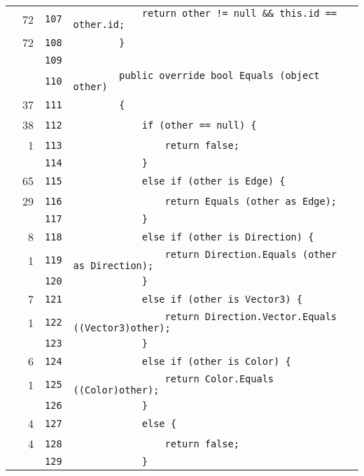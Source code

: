 \documentclass[a4paper,10pt]{article}
\begin{document}
\begin{longtable}[l]{lrrl}
\cellcolor{green} & 72 & \verb~107~ & \verb~            return other != null && this.id == other.id;~\\
\cellcolor{green} & 72 & \verb~108~ & \verb~        }~\\
\cellcolor{gray} &  & \verb~109~ & \verb~~\\
\cellcolor{gray} &  & \verb~110~ & \verb~        public override bool Equals (object other)~\\
\cellcolor{green} & 37 & \verb~111~ & \verb~        {~\\
\cellcolor{green} & 38 & \verb~112~ & \verb~            if (other == null) {~\\
\cellcolor{green} & 1 & \verb~113~ & \verb~                return false;~\\
\cellcolor{gray} &  & \verb~114~ & \verb~            }~\\
\cellcolor{green} & 65 & \verb~115~ & \verb~            else if (other is Edge) {~\\
\cellcolor{green} & 29 & \verb~116~ & \verb~                return Equals (other as Edge);~\\
\cellcolor{gray} &  & \verb~117~ & \verb~            }~\\
\cellcolor{green} & 8 & \verb~118~ & \verb~            else if (other is Direction) {~\\
\cellcolor{green} & 1 & \verb~119~ & \verb~                return Direction.Equals (other as Direction);~\\
\cellcolor{gray} &  & \verb~120~ & \verb~            }~\\
\cellcolor{green} & 7 & \verb~121~ & \verb~            else if (other is Vector3) {~\\
\cellcolor{green} & 1 & \verb~122~ & \verb~                return Direction.Vector.Equals ((Vector3)other);~\\
\cellcolor{gray} &  & \verb~123~ & \verb~            }~\\
\cellcolor{green} & 6 & \verb~124~ & \verb~            else if (other is Color) {~\\
\cellcolor{green} & 1 & \verb~125~ & \verb~                return Color.Equals ((Color)other);~\\
\cellcolor{gray} &  & \verb~126~ & \verb~            }~\\
\cellcolor{green} & 4 & \verb~127~ & \verb~            else {~\\
\cellcolor{green} & 4 & \verb~128~ & \verb~                return false;~\\
\cellcolor{gray} &  & \verb~129~ & \verb~            }~\\

\end{longtable}
\end{document}

